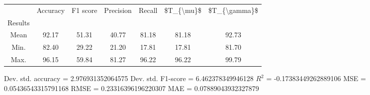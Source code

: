 \begin{tabular}{|c|c|c|c|c|c|c|}
\toprule
{} &  Accuracy &  F1 score &  Precision &  Recall &  \$T\_\{\textbackslash mu\}\$ &  \$T\_\{\textbackslash gamma\}\$ \\
Results &           &           &            &         &            &               \\
\hline
Mean    &     92.17 &     51.31 &      40.77 &   81.18 &      81.18 &         92.73 \\
Min.    &     82.40 &     29.22 &      21.20 &   17.81 &      17.81 &         81.70 \\
Max.    &     96.15 &     59.84 &      81.27 &   96.22 &      96.22 &         99.79 \\
\bottomrule
\end{tabular}

 Dev. std. accuracy = 2.976931352064575
 Dev. std. F1-score = 6.462378349946128
 $R^2$ = -0.17383449262889106
 MSE = 0.05436543315791168
 RMSE = 0.23316396196220307
 MAE = 0.07889043932327879